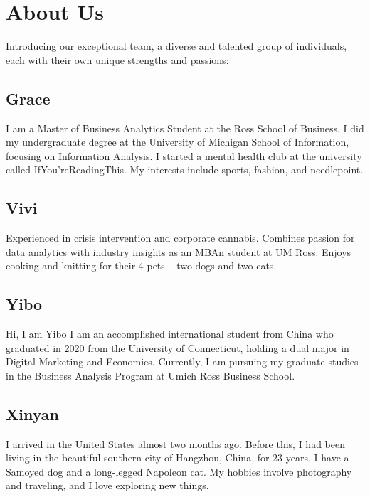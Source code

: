\documentclass[
]{book}
\begin{document}
\hypertarget{about-us}{%
\chapter{About Us}\label{about-us}}

Introducing our exceptional team, a diverse and talented group of individuals, each with their own unique strengths and passions:

\hypertarget{grace}{%
\section*{Grace}\label{grace}}

I am a Master of Business Analytics Student at the Ross School of Business. I did my undergraduate degree at the University of Michigan School of Information, focusing on Information Analysis. I started a mental health club at the university called IfYou'reReadingThis. My interests include sports, fashion, and needlepoint.

\hypertarget{vivi}{%
\section*{Vivi}\label{vivi}}

Experienced in crisis intervention and corporate cannabis. Combines passion for data analytics with industry insights as an MBAn student at UM Ross. Enjoys cooking and knitting for their 4 pets -- two dogs and two cats.

\hypertarget{yibo}{%
\section*{Yibo}\label{yibo}}

Hi, I am Yibo
I am an accomplished international student from China who graduated in 2020 from the University of Connecticut, holding a dual major in Digital Marketing and Economics. Currently, I am pursuing my graduate studies in the Business Analysis Program at Umich Ross Business School.

\hypertarget{xinyan}{%
\section*{Xinyan}\label{xinyan}}

I arrived in the United States almost two months ago. Before this, I had been living in the beautiful southern city of Hangzhou, China, for 23 years. I have a Samoyed dog and a long-legged Napoleon cat. My hobbies involve photography and traveling, and I love exploring new things.
\end{document}
